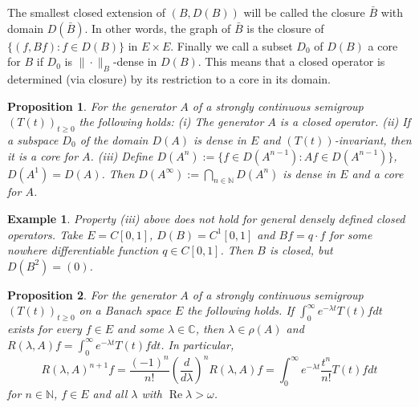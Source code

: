 \documentclass{article}
\newtheorem{proposition}{Proposition}
\newtheorem{example}{Example}
\begin{document}
The smallest closed extension of $(B,D(B))$ will be called the closure $\bar{B}$ with domain $D(\bar{B})$.
In other words, the graph of $\bar{B}$ is the closure of $\{(f,Bf): f \in D(B)\}$ in $E \times E$.
Finally we call a subset $D_0$ of $D(B)$ a core for $B$ if $D_0$ is $\|\cdot\|_B$-dense in $D(B)$.
This means that a closed operator is determined (via closure) by its restriction to a core in its domain.

\begin{proposition}
For the generator $A$ of a strongly continuous semigroup $(T(t))_{t \geq 0}$ the following holds:
(i) The generator $A$ is a closed operator.
(ii) If a subspace $D_0$ of the domain $D(A)$ is dense in $E$ and $(T(t))$-invariant, then it is a core for $A$.
(iii) Define $D(A^n) := \{f \in D(A^{n-1}): Af \in D(A^{n-1})\}$, $D(A^1) = D(A)$.
Then $D(A^\infty) := \bigcap_{n \in \mathbb{N}} D(A^n)$ is dense in $E$ and a core for $A$.
\end{proposition}

\begin{example}
Property (iii) above does not hold for general densely defined closed operators.
Take $E = C[0,1]$, $D(B) = C^1[0,1]$ and $Bf = q \cdot f$ for some nowhere differentiable function $q \in C[0,1]$.
Then $B$ is closed, but $D(B^2) = (0)$.
\end{example}

\begin{proposition}
For the generator $A$ of a strongly continuous semigroup $(T(t))_{t \geq 0}$ on a Banach space $E$ the following holds.
If $\int_0^\infty e^{-\lambda t}T(t)f dt$ exists for every $f \in E$ and some $\lambda \in \mathbb{C}$, then $\lambda \in \rho(A)$ and $R(\lambda,A)f = \int_0^\infty e^{-\lambda t}T(t)f dt$.
In particular,
\begin{equation}
R(\lambda,A)^{n+1}f = \frac{(-1)^n}{n!}\left(\frac{d}{d\lambda}\right)^n R(\lambda,A)f = \int_0^\infty e^{-\lambda t}\frac{t^n}{n!}T(t)f dt
\end{equation}
for $n \in \mathbb{N}$, $f \in E$ and all $\lambda$ with $\operatorname{Re}\lambda > \omega$.
\end{proposition}
\end{document}
